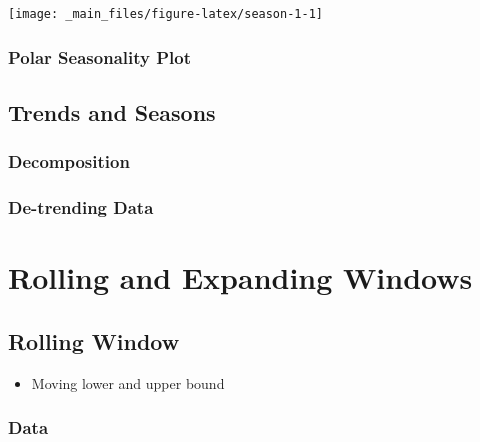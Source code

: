 \documentclass[
]{book}
\providecommand{\tightlist}{%
  \setlength{\itemsep}{0pt}\setlength{\parskip}{0pt}}
\begin{document}
\begin{center}\texttt{[image: \_main\_files/figure-latex/season-1-1]} \end{center}

\hypertarget{polar-seasonality-plot}{%
\subsection{Polar Seasonality Plot}\label{polar-seasonality-plot}}

\hypertarget{trends-and-seasons}{%
\section{Trends and Seasons}\label{trends-and-seasons}}

\hypertarget{decomposition}{%
\subsection{Decomposition}\label{decomposition}}

\hypertarget{de-trending-data}{%
\subsection{De-trending Data}\label{de-trending-data}}

\hypertarget{rolling-and-expanding-windows}{%
\chapter{Rolling and Expanding Windows}\label{rolling-and-expanding-windows}}

\hypertarget{rolling-window}{%
\section{Rolling Window}\label{rolling-window}}

\begin{itemize}
\tightlist
\item
  Moving lower and upper bound
\end{itemize}

\hypertarget{data}{%
\subsection{Data}\label{data}}
\end{document}
